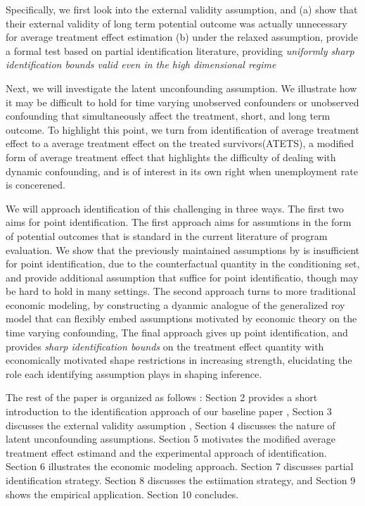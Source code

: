 \documentclass{article}
\begin{document}
Specifically, we first look into the external validity assumption, and (a) show that their external validity of long term potential outcome was actually unnecessary for average treatment effect estimation (b) under the relaxed assumption, provide a formal test based on partial identification literature, providing \textit{uniformly sharp identification bounds valid even in the high dimensional regime}

Next, we will investigate the latent unconfounding assumption. We illustrate how it may be difficult to hold for time varying unobserved confounders or unobserved confounding that simultaneously affect the treatment, short, and long term outcome. To highlight this point, we turn from identification of average treatment effect to a average treatment effect on the treated survivors(ATETS), a modified form of average treatment effect that highlights the difficulty of dealing with dynamic confounding, and is of interest in its own right when unemployment rate is concerened. 

We will approach identification of this challenging in three ways. The first two aims for point identification. The first approach aims for assumtions in the form of potential outcomes that is standard in the current literature of program evaluation. We show that the previously maintained assumptions by \cite{athey2020combining}is insufficient for point identification, due to the counterfactual quantity in the conditioning set, and provide additional assumption that suffice for point identificatio, though may be hard to hold in many settings. The second approach turns to more traditional economic modeling, by constructing a dyanmic analogue of the generalized roy model\cite{heckman2007dynamic} \cite{roy1951some}that can flexibly embed assumptions motivated by economic theory on the time varying confounding, The final approach gives up point identification, and provides \textit{sharp identification bounds }on the treatment effect quantity with economically motivated shape restrictions in increasing strength, elucidating the role each identifying assumption plays in shaping inference.

The rest of the paper is organized as follows : Section 2 provides a short introduction to the identification approach of our baseline paper \cite{athey2020combining}, Section 3 discusses the external validity assumption , Section 4 discusses the nature of latent unconfounding assumptions. Section 5 motivates the modified average treatment effect estimand and the experimental approach of identification. Section 6 illustrates the economic modeling approach. Section 7 discusses partial identification strategy. Section 8 discusses the estiimation strategy, and Section 9 shows the empirical application. Section 10 concludes.
\end{document}
